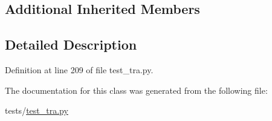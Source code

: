 \subsection*{Additional Inherited Members}


\subsection{Detailed Description}


Definition at line 209 of file test\+\_\+tra.\+py.



The documentation for this class was generated from the following file\+:\begin{DoxyCompactItemize}
\item 
tests/\hyperlink{test__tra_8py}{test\+\_\+tra.\+py}\end{DoxyCompactItemize}
